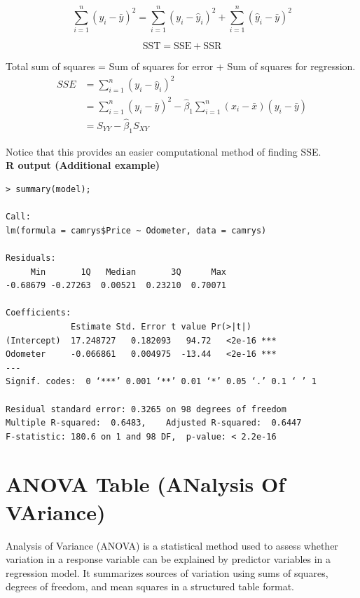 \[
\sum_{i=1}^{n}(y_i - \bar{y})^2 = \sum_{i=1}^{n}(y_i - \hat{y}_i)^2 + \sum_{i=1}^{n}(\hat{y}_i - \bar{y})^2
\]

\[
\text{SST} = \text{SSE} + \text{SSR}
\]

Total sum of squares = Sum of squares for error + Sum of squares for regression.\\
\[
\begin{aligned}
SSE &= \sum_{i=1}^{n} (y_i - \hat{y}_i)^2 \\
    &= \sum_{i=1}^{n} (y_i - \bar{y})^2 - \hat{\beta}_1 \sum_{i=1}^{n} (x_i - \bar{x})(y_i - \bar{y}) \\
    &= S_{YY} - \hat{\beta}_1 S_{XY}
\end{aligned}
\]

\noindent Notice that this provides an easier computational method of finding SSE.\\

\noindent\textbf{R output (Additional example)}

\begin{tcolorbox}[colback=gray!10, colframe=black!45, arc=2mm]
\begin{verbatim}
> summary(model);

Call:
lm(formula = camrys$Price ~ Odometer, data = camrys)

Residuals:
     Min       1Q   Median       3Q      Max 
-0.68679 -0.27263  0.00521  0.23210  0.70071 

Coefficients:
             Estimate Std. Error t value Pr(>|t|)    
(Intercept)  17.248727   0.182093   94.72   <2e-16 ***
Odometer     -0.066861   0.004975  -13.44   <2e-16 ***
---
Signif. codes:  0 ‘***’ 0.001 ‘**’ 0.01 ‘*’ 0.05 ‘.’ 0.1 ‘ ’ 1

Residual standard error: 0.3265 on 98 degrees of freedom
Multiple R-squared:  0.6483,    Adjusted R-squared:  0.6447 
F-statistic: 180.6 on 1 and 98 DF,  p-value: < 2.2e-16
\end{verbatim}
\end{tcolorbox}
\section{ANOVA Table (ANalysis Of VAriance)}

Analysis of Variance (ANOVA) is a statistical method used to assess whether variation in a response variable can be explained by predictor variables in a regression model. It summarizes sources of variation using sums of squares, degrees of freedom, and mean squares in a structured table format.

